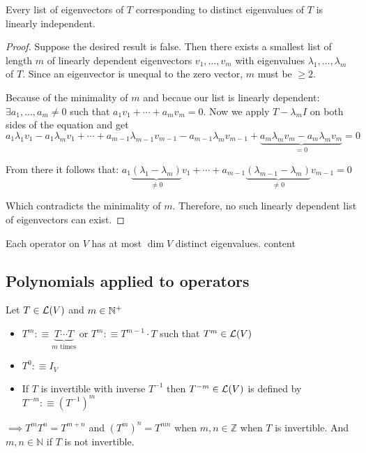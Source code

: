 \setcounter{thm}{10}
\begin{thm}
    Every list of eigenvectors of $T$ corresponding to distinct eigenvalues of $T$ is linearly independent.
\end{thm}
\begin{proof}
    Suppose the desired result is false. Then there exists a smallest list of length $m$ of linearly dependent eigenvectors $v_1, \dots, v_m$ with eigenvalues $\lambda_1, \dots, \lambda_m$ of $T$. Since an eigenvector is unequal to the zero vector, $m$ must be $\geq 2$.
    
    Because of the minimality of $m$ and becaue our list is linearly dependent: $\exists a_1, \dots, a_m \neq 0$ such that $a_1 v_1 + \cdots + a_m v_m = 0$. Now we apply $T-\lambda_m I$ on both sides of the equation and get  
    $a_1 \lambda_1 v_1 - a_1 \lambda_m v_1 + \cdots +
    a_{m-1} \lambda_{m-1} v_{m-1} - a_{m-1} \lambda_{m} v_{m-1} +
    \underbrace{a_m \lambda_m v_m -a_m \lambda_m v_m}_{=0}=0$
   
    From there it follows that:
   $a_1 \underbrace{(\lambda_1 - \lambda_m)}_{\neq 0} v_1 + \cdots + a_{m-1} \underbrace{(\lambda_{m-1}-\lambda_{m})}_{\neq 0} v_{m-1}=0$
   
   Which contradicts the minimality of $m$. Therefore, no such linearly dependent list of eigenvectors can exist.
\end{proof}

\begin{thm}
    Each operator on $V$ has at most $\dim V$ distinct eigenvalues.
    content
\end{thm}

\paragraph{}

\subsection{Polynomials applied to operators}

\setcounter{thm}{12}
\begin{mydef}
    Let $T \in \mathcal{L}(V)$ and $m\in \mathbb{N}^{+}$ 
    \begin{itemize}
        \item $T^{m} :\equiv \underbrace{T \cdots T}_{\text{$m$ times}}$ or $T^{m} :\equiv T^{m-1} \cdot T$ such that $T^{m} \in \mathcal{L}(V)$
        \item $T^0 :\equiv I_V$
        \item If $T$ is invertible with inverse $T^{-1}$ then $T^{-m}\in \mathcal{L}(V)$ is defined by $T^{-m} :\equiv (T^{-1})^m$ 
    \end{itemize}
\end{mydef}
$\implies T^m T^n = T^{m+n}$ and $(T^m)^n=T^{mn}$ when $m,n \in \mathbb{Z}$ when $T$ is invertible. And $m,n \in \mathbb{N}$ if $T$ is not invertible.


